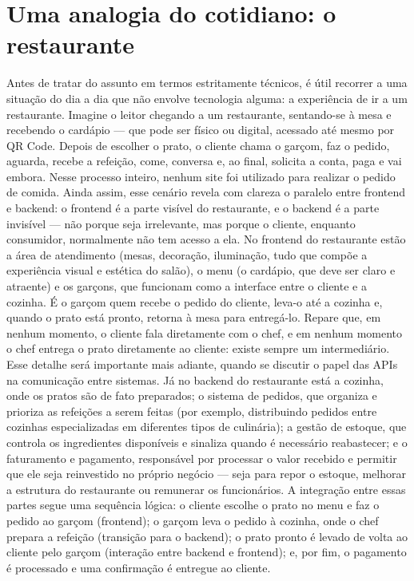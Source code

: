 \section{Uma analogia do cotidiano: o restaurante}

Antes de tratar do assunto em termos estritamente técnicos, é útil recorrer a uma situação do dia a dia que não envolve tecnologia alguma: a experiência de ir a um restaurante. Imagine o leitor chegando a um restaurante, sentando-se à mesa e recebendo o cardápio — que pode ser físico ou digital, acessado até mesmo por QR Code. Depois de escolher o prato, o cliente chama o garçom, faz o pedido, aguarda, recebe a refeição, come, conversa e, ao final, solicita a conta, paga e vai embora. Nesse processo inteiro, nenhum site foi utilizado para realizar o pedido de comida. Ainda assim, esse cenário revela com clareza o paralelo entre frontend e backend: o frontend é a parte visível do restaurante, e o backend é a parte invisível — não porque seja irrelevante, mas porque o cliente, enquanto consumidor, normalmente não tem acesso a ela. No frontend do restaurante estão a área de atendimento (mesas, decoração, iluminação, tudo que compõe a experiência visual e estética do salão), o menu (o cardápio, que deve ser claro e atraente) e os garçons, que funcionam como a interface entre o cliente e a cozinha. É o garçom quem recebe o pedido do cliente, leva-o até a cozinha e, quando o prato está pronto, retorna à mesa para entregá-lo. Repare que, em nenhum momento, o cliente fala diretamente com o chef, e em nenhum momento o chef entrega o prato diretamente ao cliente: existe sempre um intermediário. Esse detalhe será importante mais adiante, quando se discutir o papel das APIs na comunicação entre sistemas. Já no backend do restaurante está a cozinha, onde os pratos são de fato preparados; o sistema de pedidos, que organiza e prioriza as refeições a serem feitas (por exemplo, distribuindo pedidos entre cozinhas especializadas em diferentes tipos de culinária); a gestão de estoque, que controla os ingredientes disponíveis e sinaliza quando é necessário reabastecer; e o faturamento e pagamento, responsável por processar o valor recebido e permitir que ele seja reinvestido no próprio negócio — seja para repor o estoque, melhorar a estrutura do restaurante ou remunerar os funcionários. A integração entre essas partes segue uma sequência lógica: o cliente escolhe o prato no menu e faz o pedido ao garçom (frontend); o garçom leva o pedido à cozinha, onde o chef prepara a refeição (transição para o backend); o prato pronto é levado de volta ao cliente pelo garçom (interação entre backend e frontend); e, por fim, o pagamento é processado e uma confirmação é entregue ao cliente.

